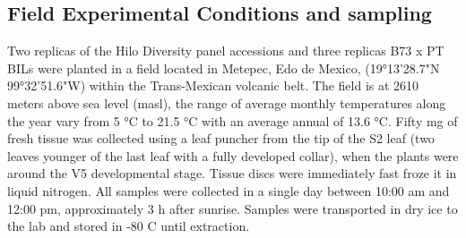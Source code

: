\documentclass[9pt,twocolumn,twoside,lineno]{gsajnl}
\begin{document}
\subsection{Field Experimental Conditions and sampling} 
Two replicas of the Hilo Diversity panel accessions and three replicas B73 x PT BILs were planted in a field located in Metepec, Edo de Mexico, (19°13'28.7"N 99°32'51.6"W) within the Trans-Mexican volcanic belt. 
The field is at 2610 meters above sea level (masl), the range of average monthly temperatures along the year vary from 5 °C to 21.5 °C with an average annual of 13.6 °C.  
Fifty mg of fresh tissue was collected using a leaf puncher from the tip of the S2 leaf (two leaves younger of the last leaf with a fully developed collar), when the plants were around the V5 developmental stage. 
Tissue discs were immediately fast froze it in liquid nitrogen. All samples were collected in a single day between 10:00 am and 12:00 pm, approximately 3 h after sunrise. 
Samples were transported in dry ice to the lab and stored in -80 C until extraction. 
\end{document}
